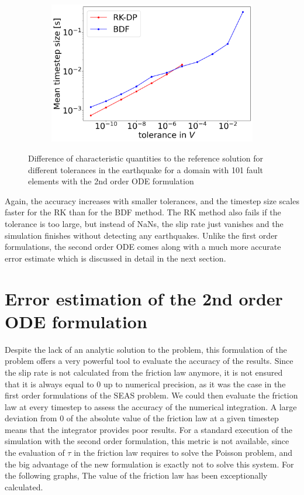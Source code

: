 \begin{figure}[H]
\begin{subfigure}[t]{0.32\textwidth}
		\includegraphics[width=1\textwidth]{images/TANDEMextendedODEDifferentTolerancesSize101_EQ_DT.png}
	\end{subfigure}
	\caption{Difference of characteristic quantities to the reference solution for different tolerances in the earthquake for a domain with 101 fault elements with the 2nd order ODE formulation}
	\label{fig:tolerancesEarthquake_extendedODE}
\end{figure}
Again, the accuracy increases with smaller tolerances, and the timestep size scales faster for the RK than for the BDF method. The RK method also fails if the tolerance is too large, but instead of NaNs, the slip rate just vanishes and the simulation finishes without detecting any earthquakes. Unlike the first order formulations, the second order ODE comes along with a much more accurate error estimate which is discussed in detail in the next section.




\section{Error estimation of the 2nd order ODE formulation}
Despite the lack of an analytic solution to the problem, this formulation of the problem offers a very powerful tool to evaluate the accuracy of the results. Since the slip rate is not calculated from the friction law anymore, it is not ensured that it is always equal to 0 up to numerical precision, as it was the case in the first order formulations of the SEAS problem. We could then evaluate the friction law at every timestep to assess the accuracy of the numerical integration. A large deviation from 0 of the absolute value of the friction law at a given timestep means that the integrator provides poor results. For a standard execution of the simulation with the second order formulation, this metric is not available, since the evaluation of $\tau$ in the friction law requires to solve the Poisson problem, and the big advantage of the new formulation is exactly not to solve this system. For the following graphs, The value of the friction law has been exceptionally calculated. \\

